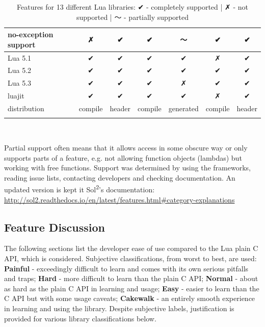 \documentclass[conference,compsoc]{IEEEtran}
\newcommand{\soltwo}{Sol\textsuperscript{2}}
\begin{document}
\begin{table}[ht!]
\begin{tabular}{l c c c c c c }
		\\ \hline
		no-exception support      &        ✗       &     ✔    &     ✔    &     〜     &        ✔        &    ✔
		\\ \hline
		Lua 5.1                   &        ✔       &     ✔    &     ✔    &     ✔     &        ✗        &    ✔
		\\ \hline
		Lua 5.2                   &        ✔       &     ✔    &     ✔    &     ✔     &        ✔        &    ✔
		\\ \hline
		Lua 5.3                   &        ✔       &     ✔    &     ✔    &     ✗     &        ✔        &    ✔
		\\ \hline
		luajit                    &        ✔       &     ✔    &     ✔    &     ✔     &        ✗        &    ✔
		\\ \hline
		distribution              &     compile    &  header  &  compile & generated &     compile     & header
		\\ \hline \\
	\end{tabular}
	\\
	\caption{Features for 13 different Lua libraries: ✔ - completely supported | ✗ - not supported | 〜 - partially supported}
	Partial support often means that it allows access in some obscure way or only supports parts of a feature, e.g. not allowing function objects (lambdas) but working with free functions. Support was determined by using the frameworks, reading issue lists, contacting developers and checking documentation. An updated version is kept it \soltwo{}'s documentation: \url{http://sol2.readthedocs.io/en/latest/features.html\#category-explanations}
	\label{table:feature-table}
\end{table}

\subsection{Feature Discussion}

The following sections list the developer ease of use compared to the Lua plain C API, which is considered. Subjective classifications, from worst to best, are used: \textbf{Painful} - exceedingly difficult to learn and comes with its own serious pitfalls and traps; \textbf{Hard} - more difficult to learn than the plain C API; \textbf{Normal} - about as hard as the plain C API in learning and usage; \textbf{Easy} - easier to learn than the C API but with some usage caveats; \textbf{Cakewalk} - an entirely smooth experience in learning and using the library. Despite subjective labels, justification is provided for various library classifications below.
\end{document}
